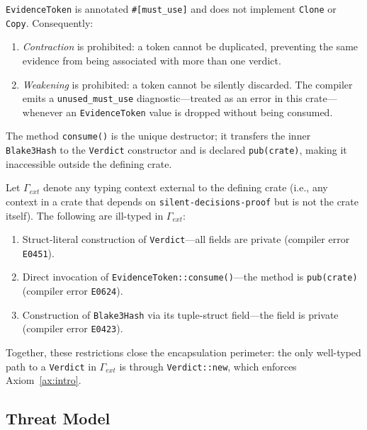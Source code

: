 \begin{axiom}
\label{ax:unique}
\texttt{EvidenceToken} is annotated \texttt{\#[must\_use]} and does
not implement \texttt{Clone} or \texttt{Copy}.  Consequently:
\begin{enumerate}
  \item \emph{Contraction} is prohibited: a token cannot be
    duplicated, preventing the same evidence from being
    associated with more than one verdict.
  \item \emph{Weakening} is prohibited: a token cannot be silently
    discarded.  The compiler emits a \texttt{unused\_must\_use}
    diagnostic---treated as an error in this crate---whenever an
    \texttt{EvidenceToken} value is dropped without being consumed.
\end{enumerate}
The method \texttt{consume()} is the unique destructor; it transfers
the inner \texttt{Blake3Hash} to the \texttt{Verdict} constructor and
is declared \texttt{pub(crate)}, making it inaccessible outside the
defining crate.
\end{axiom}

\begin{axiom}
\label{ax:encap}
Let $\Gamma_{\mathit{ext}}$ denote any typing context external to the
defining crate (i.e., any context in a crate that depends on
\texttt{silent-decisions-proof} but is not the crate itself).
The following are ill-typed in $\Gamma_{\mathit{ext}}$:
\begin{enumerate}
  \item Struct-literal construction of \texttt{Verdict}---all fields
    are private (compiler error \texttt{E0451}).
  \item Direct invocation of \texttt{EvidenceToken::consume()}---the
    method is \texttt{pub(crate)} (compiler error \texttt{E0624}).
  \item Construction of \texttt{Blake3Hash} via its tuple-struct
    field---the field is private (compiler error \texttt{E0423}).
\end{enumerate}
Together, these restrictions close the encapsulation perimeter: the
only well-typed path to a \texttt{Verdict} in $\Gamma_{\mathit{ext}}$
is through \texttt{Verdict::new}, which enforces
Axiom~\ref{ax:intro}.
\end{axiom}

\subsection{Threat Model}
\label{sec:threat}

